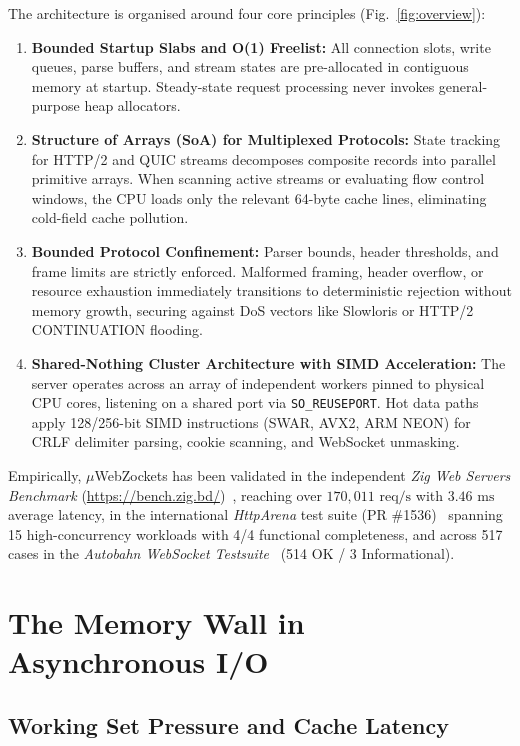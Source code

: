 \documentclass[journal]{IEEEtran}
\begin{document}
The architecture is organised around four core principles (Fig.~\ref{fig:overview}):
\begin{enumerate}
    \item \textbf{Bounded Startup Slabs and O(1) Freelist:} All connection slots, write queues, parse buffers, and stream states are pre-allocated in contiguous memory at startup. Steady-state request processing never invokes general-purpose heap allocators.
    \item \textbf{Structure of Arrays (SoA) for Multiplexed Protocols:} State tracking for HTTP/2 and QUIC streams decomposes composite records into parallel primitive arrays. When scanning active streams or evaluating flow control windows, the CPU loads only the relevant 64-byte cache lines, eliminating cold-field cache pollution.
    \item \textbf{Bounded Protocol Confinement:} Parser bounds, header thresholds, and frame limits are strictly enforced. Malformed framing, header overflow, or resource exhaustion immediately transitions to deterministic rejection without memory growth, securing against DoS vectors like Slowloris or HTTP/2 CONTINUATION flooding.
    \item \textbf{Shared-Nothing Cluster Architecture with SIMD Acceleration:} The server operates across an array of independent workers pinned to physical CPU cores, listening on a shared port via \texttt{SO\_REUSEPORT}. Hot data paths apply 128/256-bit SIMD instructions (SWAR, AVX2, ARM NEON) for CRLF delimiter parsing, cookie scanning, and WebSocket unmasking.
\end{enumerate}

Empirically, \ensuremath{\mu}WebZockets has been validated in the independent \textit{Zig Web Servers Benchmark} (\url{https://bench.zig.bd/})~\cite{bench_zig_bd}, reaching over $170{,}011\text{ req/s}$ with $3.46\text{ ms}$ average latency, in the international \textit{HttpArena} test suite (PR \#1536)~\cite{httparena_pr1536} spanning 15 high-concurrency workloads with 4/4 functional completeness, and across 517 cases in the \textit{Autobahn WebSocket Testsuite}~\cite{autobahn} (514 OK / 3 Informational).

\section{The Memory Wall in Asynchronous I/O}

\subsection{Working Set Pressure and Cache Latency}
\end{document}
